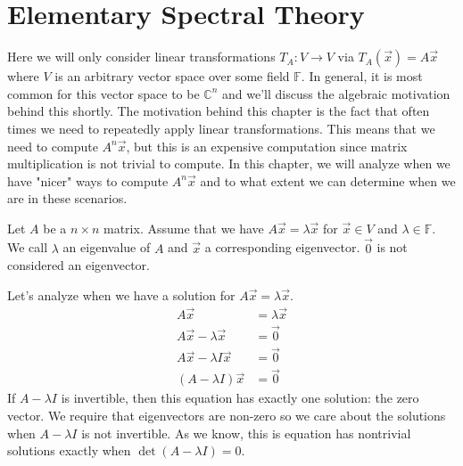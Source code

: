 \chapter{Elementary Spectral Theory}

Here we will only consider linear transformations $T_A:V\to V$ via $T_A(\vec{x})=A\vec{x}$ where $V$ is an arbitrary vector space over some field $\mathbb{F}$. In general, it is most common for this vector space to be $\mathbb{C}^n$ and we'll discuss the algebraic motivation behind this shortly. The motivation behind this chapter is the fact that often times we need to repeatedly apply linear transformations. This means that we need to compute $A^n\vec{x}$, but this is an expensive computation since matrix multiplication is not trivial to compute. In this chapter, we will analyze when we have "nicer" ways to compute $A^n\vec{x}$ and to what extent we can determine when we are in these scenarios.
\begin{definition}
    Let $A$ be a $n\times n$ matrix. Assume that we have $A\vec{x}=\lambda\vec{x}$ for $\vec{x}\in V$ and $\lambda\in\mathbb{F}$. We call $\lambda$ an eigenvalue of $A$ and $\vec{x}$ a corresponding eigenvector. $\vec{0}$ is not considered an eigenvector.
\end{definition}
Let's analyze when we have a solution for $A\vec{x}=\lambda\vec{x}$.
\begin{align*}
    A\vec{x}&=\lambda\vec{x}\\
    A\vec{x}-\lambda\vec{x}&=\vec{0}\\
    A\vec{x}-\lambda I\vec{x}&=\vec{0}\\
    (A-\lambda I)\vec{x}&=\vec{0}
\end{align*}
If $A-\lambda I$ is invertible, then this equation has exactly one solution: the zero vector. We require that eigenvectors are non-zero so we care about the solutions when $A-\lambda I$ is not invertible. As we know, this is equation has nontrivial solutions exactly when $\det(A-\lambda I)=0$.
